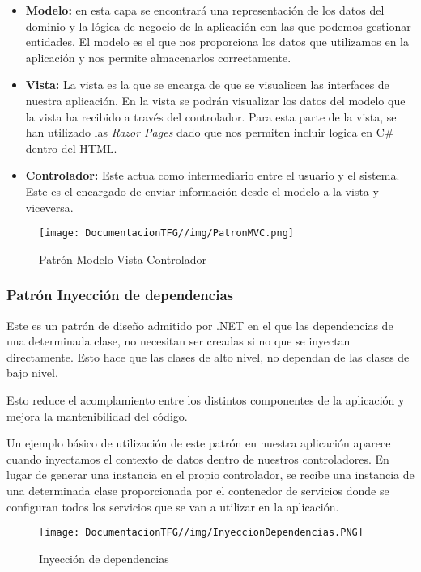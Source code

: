 \begin{itemize}
    \item \textbf{Modelo:} en esta capa se encontrará una representación de los datos del dominio y la lógica de negocio de la aplicación con las que podemos gestionar entidades. El modelo es el que nos proporciona los datos que utilizamos en la aplicación y nos permite almacenarlos correctamente.
    \item \textbf{Vista:} La vista es la que se encarga de que se visualicen las interfaces de nuestra aplicación. En la vista se podrán visualizar los datos del modelo que la vista ha recibido a través del controlador.
    Para esta parte de la vista, se han utilizado las \textit{Razor Pages} dado que nos permiten incluir logica en C\# dentro del HTML.
    \item \textbf{Controlador:} Este actua como intermediario entre el usuario y el sistema. Este es el encargado de enviar información desde el modelo a la vista y viceversa.
\end{itemize}

\begin{figure}[H]
    \centering
    \texttt{[image: DocumentacionTFG//img/PatronMVC.png]}
    \caption{Patrón Modelo-Vista-Controlador}
\end{figure}

\subsubsection{Patrón Inyección de dependencias}

Este es un patrón de diseño admitido por .NET en el que las dependencias de una determinada clase, no necesitan ser creadas si no que se inyectan directamente. Esto hace que las clases de alto nivel, no dependan de las clases de bajo nivel.

Esto reduce el acomplamiento entre los distintos componentes de la aplicación y mejora la mantenibilidad del código.

Un ejemplo básico de utilización de este patrón en nuestra aplicación aparece cuando inyectamos el contexto de datos dentro de nuestros controladores. En lugar de generar una instancia en el propio controlador, se recibe una instancia de una determinada clase proporcionada por el contenedor de servicios donde se configuran todos los servicios que se van a utilizar en la aplicación.

\begin{figure}[H]
    \centering
    \texttt{[image: DocumentacionTFG//img/InyeccionDependencias.PNG]}
    \caption{Inyección de dependencias}
\end{figure}

